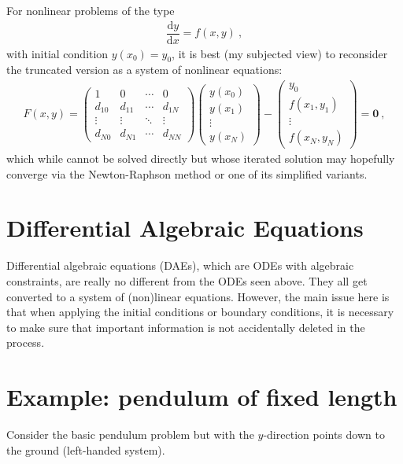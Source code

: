 \documentclass[11pt]{amsdtx}
\newcommand{\ud}{\mathrm{d}}
\newcommand{\mbf}[1]{\mathbf{\boldsymbol{#1}}}
\begin{document}
For nonlinear problems of the type
\begin{eqnarray}
	\dfrac{\ud y}{\ud x} = f(x, y)~,
\end{eqnarray}
with initial condition $y(x_0) = y_0$, it is best (my subjected view) to reconsider the truncated version as a system of nonlinear equations:
\begin{eqnarray}
	F(x, y) = \begin{pmatrix}
		1    & 0 & \cdots & 0 \\
		d_{10} & d_{11} & \cdots & d_{1N} \\
		\vdots & \vdots & \ddots & \vdots \\
		d_{N0} & d_{N1} & \cdots & d_{NN}
	\end{pmatrix}
	\begin{pmatrix}
		y(x_0) \\ y(x_1) \\ \vdots \\ y(x_N)
	\end{pmatrix}
	-
	\begin{pmatrix}
		y_0 \\ f(x_1, y_1) \\ \vdots \\ f(x_N, y_N)
	\end{pmatrix}
	= \mbf{0}~,
\end{eqnarray}
which while cannot be solved directly but whose iterated solution may hopefully converge via the Newton-Raphson method or one of its simplified variants.

\section{Differential Algebraic Equations}

Differential algebraic equations (DAEs), which are ODEs with algebraic constraints, are really no different from the ODEs seen above.  They all get converted to a system of (non)linear equations.  However, the main issue here is that when applying the initial conditions or boundary conditions, it is necessary to make sure that important information is not accidentally deleted in the process.  

\section{Example: pendulum of fixed length}

Consider the basic pendulum problem but with the $y$-direction points down to the ground (left-handed system).  
\end{document}
